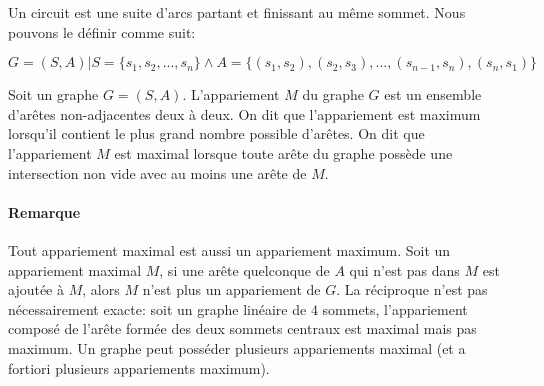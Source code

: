 \begin{definition}[Circuit]
Un circuit est une suite d'arcs partant et finissant au même sommet. Nous pouvons le définir comme suit: \begin{center}
$G = (S, A) | S = \{s_1, s_2, ..., s_n\} \wedge  A=\{(s_1, s_2), (s_2, s_3), ..., (s_{n-1}, s_n), (s_n, s_1)\}$
\end{center}
\end{definition}

\begin{definition}[Appariement]
Soit un graphe $G = (S, A)$. L'appariement $M$ du graphe $G$ est un ensemble d'arêtes non-adjacentes deux à deux. On dit que l'appariement est maximum lorsqu'il contient le plus grand nombre possible d'arêtes. On dit que l'appariement $M$ est maximal lorsque toute arête du graphe possède une intersection non vide avec au moins une arête de $M$.
\end{definition}

\paragraph{Remarque}
Tout appariement maximal est aussi un appariement maximum. Soit un appariement maximal $M$, si une arête quelconque de $A$ qui n'est pas dans $M$ est ajoutée à $M$, alors $M$ n'est plus un appariement de $G$. La réciproque n'est pas nécessairement exacte: soit un graphe linéaire de $4$ sommets, l'appariement composé de l'arête formée des deux sommets centraux est maximal mais pas maximum. Un graphe peut posséder plusieurs appariements maximal (et a fortiori plusieurs appariements maximum).